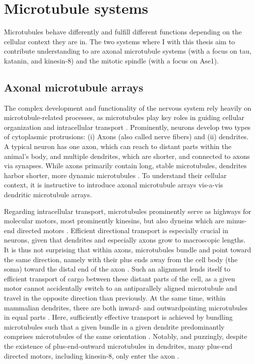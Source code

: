\section{Microtubule systems}
Microtubules behave differently and fulfill different functions depending on the cellular context they are in. The two systems where I with this thesis aim to contribute understanding to are axonal microtubule systems (with a focus on tau, katanin, and kinesin-8) and the mitotic spindle (with a focus on Ase1).

\subsection{Axonal microtubule arrays}
\label{sec:neuron}
The complex development and functionality of the nervous system rely heavily on microtubule-related processes, as microtubules play key roles in guiding cellular organization and intracellular transport \parencite{Kapitein2015}. Prominently, neurons develop two types of cytoplasmic protrusions: (i) Axons (also called nerve fibers) and (ii) dendrites. A typical neuron has one axon, which can reach to distant parts within the animal's body, and multiple dendrites, which are shorter, and connected to axons via synapses. While axons primarily contain long, stable microtubules, dendrites harbor shorter, more dynamic microtubules \parencite{Tas2017}. To understand their cellular context, it is instructive to introduce axonal microtubule arrays vis-a-vis dendritic microtubule arrays.\par

Regarding intracellular transport, microtubules prominently serve as highways for molecular motors, most prominently kinesins, but also dyneins which are minus-end directed motors \parencite{Kapitein2015}. Efficient directional transport is especially crucial in neurons, given that dendrites and especially axons grow to macroscopic lengths. It is thus not surprising that within axons, microtubules bundle and point toward the same direction, namely with their plus ends away from the cell body (the soma) toward the distal end of the axon \parencite{Tas2017}. Such an alignment lends itself to efficient transport of cargo between these distant parts of the cell, as a given motor cannot accidentally switch to an antiparallely aligned microtubule and travel in the opposite direction than previously. At the same time, within mammalian dendrites, there are both inward- and outwardpointing microtubules in equal parts \parencite{Tas2017}. Here, sufficiently effective transport is achieved by bundling microtubules such that a given bundle in a given dendrite predominantly comprises microtubules of the same orientation \parencite{Tas2017}. Notably, and puzzingly, despite the existence of plus-end-outward microtubules in dendrites, many plus-end directed motors, including kinesin-8, only enter the axon \parencite{Lipka2016}.\par

